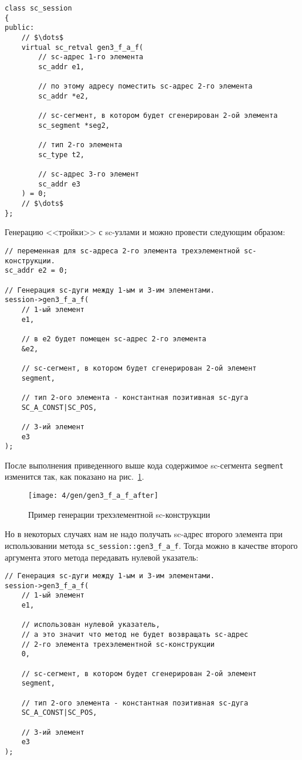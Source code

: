 \begin{lstlisting}[texcl]
class sc_session
{
public:
    // $\dots$
    virtual sc_retval gen3_f_a_f(
        // sc-адрес 1-го элемента
        sc_addr e1,

        // по этому адресу поместить sc-адрес 2-го элемента
        sc_addr *e2,

        // sc-сегмент, в котором будет сгенерирован 2-ой элемента
        sc_segment *seg2,

        // тип 2-го элемента
        sc_type t2,

        // sc-адрес 3-го элемент
        sc_addr e3
    ) = 0;
    // $\dots$
};
\end{lstlisting}

Генерацию <<тройки>> с sc-узлами  и  можно
провести следующим образом:

\begin{lstlisting}[texcl]
// переменная для sc-адреса 2-го элемента трехэлементной sc-конструкции.
sc_addr e2 = 0;

// Генерация sc-дуги между 1-ым и 3-им элементами.
session->gen3_f_a_f(
    // 1-ый элемент
    e1,

    // в e2 будет помещен sc-адрес 2-го элемента
    &e2,

    // sc-сегмент, в котором будет сгенерирован 2-ой элемент
    segment,

    // тип 2-ого элемента - константная позитивная sc-дуга
    SC_A_CONST|SC_POS,

    // 3-ий элемент
    e3
);
\end{lstlisting}

После выполнения приведенного выше кода содержимое sc-сегмента
\lstinline|segment| изменится так, как показано на
рис.~\ref{fig:gen3_f_a_f_after}.

\begin{figure}[h!]
  \centering
  \texttt{[image: 4/gen/gen3\_f\_a\_f\_after]}
  \caption{Пример генерации трехэлементной sc-конструкции}
  \label{fig:gen3_f_a_f_after}
\end{figure}

Но в некоторых случаях нам не надо получать sc-адрес второго элемента
при использовании метода \lstinline|sc_session::gen3_f_a_f|. Тогда
можно в качестве второго аргумента этого метода передавать нулевой
указатель:

\begin{lstlisting}[texcl]
// Генерация sc-дуги между 1-ым и 3-им элементами.
session->gen3_f_a_f(
    // 1-ый элемент
    e1,

    // использован нулевой указатель,
    // а это значит что метод не будет возвращать sc-адрес
    // 2-го элемента трехэлементной sc-конструкции
    0,

    // sc-сегмент, в котором будет сгенерирован 2-ой элемент
    segment,

    // тип 2-ого элемента - константная позитивная sc-дуга
    SC_A_CONST|SC_POS,

    // 3-ий элемент
    e3
);
\end{lstlisting}

